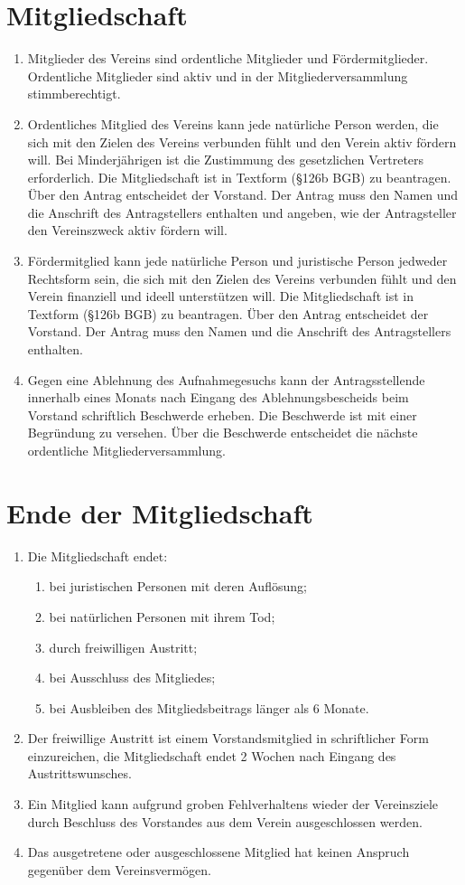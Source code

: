 \documentclass[ngerman]{article}
\begin{document}
\section{Mitgliedschaft}
\begin{enumerate}
  \item Mitglieder des Vereins sind ordentliche Mitglieder und Fördermitglieder. Ordentliche Mitglieder sind aktiv und in der Mitgliederversammlung stimmberechtigt.
  \item Ordentliches Mitglied des Vereins kann jede natürliche Person werden, die sich mit den Zielen des Vereins verbunden fühlt und den Verein aktiv fördern will. Bei Minderjährigen ist die Zustimmung des gesetzlichen Vertreters erforderlich. Die Mitgliedschaft ist in Textform (§126b BGB) zu beantragen. Über den Antrag entscheidet der Vorstand. Der Antrag muss den Namen und die Anschrift des Antragstellers enthalten und angeben, wie der Antragsteller den Vereinszweck aktiv fördern will.
  \item Fördermitglied kann jede natürliche Person und juristische Person jedweder Rechtsform sein, die sich mit den Zielen des Vereins verbunden fühlt und den Verein finanziell und ideell unterstützen will. Die Mitgliedschaft ist in Textform (§126b BGB) zu beantragen. Über den Antrag entscheidet der Vorstand. Der Antrag muss den Namen und die Anschrift des Antragstellers enthalten. 
  \item Gegen eine Ablehnung des Aufnahmegesuchs kann der Antragsstellende innerhalb eines Monats nach Eingang des Ablehnungsbescheids beim Vorstand schriftlich Beschwerde erheben. Die Beschwerde ist mit einer Begründung zu versehen. Über die Beschwerde entscheidet die nächste ordentliche Mitgliederversammlung.
\end{enumerate}


\section{Ende der Mitgliedschaft}
\begin{enumerate}
  \item Die Mitgliedschaft endet:
  \begin{enumerate}
    \item bei juristischen Personen mit deren Auflösung;
    \item bei natürlichen Personen mit ihrem Tod;
    \item durch freiwilligen Austritt;
    \item bei Ausschluss des Mitgliedes;
    \item bei Ausbleiben des Mitgliedsbeitrags länger als 6 Monate.
  \end{enumerate}
  \item Der freiwillige Austritt ist einem Vorstandsmitglied in schriftlicher Form einzureichen, die Mitgliedschaft endet 2 Wochen nach Eingang des Austrittswunsches.
  \item Ein Mitglied kann aufgrund groben Fehlverhaltens wieder der Vereinsziele durch Beschluss des Vorstandes aus dem Verein ausgeschlossen werden.
  \item Das ausgetretene oder ausgeschlossene Mitglied hat keinen Anspruch gegenüber dem Vereinsvermögen.
\end{enumerate}
\end{document}
